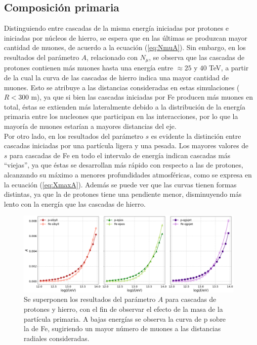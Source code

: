 %	
		
		
	\subsection{Composici\'on primaria}	
	Distinguiendo entre cascadas de la misma energ\'ia iniciadas por protones e iniciadas por n\'ucleos de hierro, se espera que en las \'ultimas se produzcan mayor cantidad de muones, de acuerdo a la ecuaci\'on (\ref{eq:NmuA}). Sin embargo, en los resultados del par\'ametro $A$, relacionado con $N_{\mu}$, se observa que las cascadas de protones contienen m\'as muones hasta una energ\'ia entre $\approx 25$ y $40$ TeV, a partir de la cual la curva de las cascadas de hierro indica una mayor cantidad de muones. Esto se atribuye a las distancias consideradas en estas simulaciones ($R < 300$ m), ya que si bien las cascadas iniciadas por Fe producen m\'as muones en total, \'estas se extienden m\'as lateralmente debido a la distribuci\'on de la energ\'ia primaria entre los nucleones que participan en las interacciones, por lo que la mayor\'ia de muones estar\'ian a mayores distancias del eje.\\
			
	Por otro lado, en los resultados del par\'ametro $s$ es evidente la distinci\'on entre cascadas iniciadas por una part\'icula ligera y una pesada. Los mayores valores de $s$ para cascadas de Fe en todo el intervalo de energ\'ia indican cascadas m\'as ``viejas'', ya que \'estas se desarrollan m\'as r\'apido con respecto a las de protones, alcanzando su m\'aximo a menores profundidades atmosf\'ericas, como se expresa en la ecuaci\'on (\ref{eq:XmaxA}). Adem\'as se puede ver que las curvas tienen formas distintas, ya que la de protones tiene una pendiente menor, disminuyendo m\'as lento con la energ\'ia que las cascadas de hierro.\\
		\begin{figure} [h]
		\includegraphics[width=\textwidth]{Figuras/composition_nkgA}
		\caption{Se superponen los resultados del par\'ametro $A$ para cascadas de protones y hierro, con el fin de observar el efecto de la masa de la part\'icula primaria. A bajas energ\'ias se observa la curva de p sobre la de Fe, sugiriendo un mayor n\'umero de muones a las distancias radiales consideradas.}
		\label{fig:composition_nkgA}
		\end{figure}		
		
